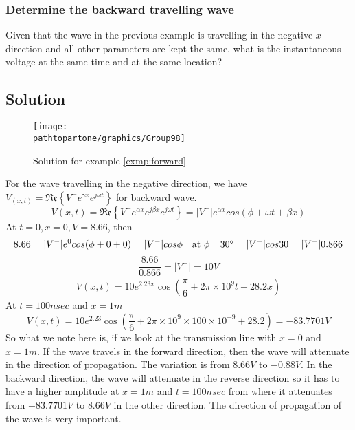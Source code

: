 \begin{exmp}
\subsubsection*{Determine the backward travelling wave}
Given that the wave in the previous example is travelling in the negative ${x}$ direction and all other parameters are kept the same, what is the instantaneous voltage at the same time and at the same location?

\subsection*{Solution}
\begin{figure}[h]
\centering
\texttt{[image: \\pathtopartone/graphics/Group98]}
\caption{Solution for example \ref{exmp:forward}}
\label{fig:group98}
\end{figure}

For the wave travelling in the negative direction, we have $V_{(x,t)} = \mathfrak{Re}\left\lbrace V^{-}e^{\gamma x}e^{j\omega t}\right\rbrace$ for backward wave.
\begin{dmath*}
V(x,t) = \mathfrak{Re}\left\lbrace{V^{-}e^{\alpha x}e^{j\beta x}e^{j\omega t}}\right\rbrace = |V^{-}|e^{\alpha x}cos{(\phi+\omega t + \beta x)}
\end{dmath*}
At ${t=0, x=0, V=8.66}$, then
\begin{dmath*}
{8.66} = {|V^{-}|}e^{0} cos({\phi + 0 + 0})
= {|V^-|{cos\phi}} \quad \text{at }\phi\text{= 30\textdegree} 
= {|V^-|{cos30}}
= {|V^-|{0.866}}
\end{dmath*}
\begin{dmath*}
\frac{8.66}{0.866} = {|V^-|} = 10V
\end{dmath*}
\begin{align*}
V({x,t}) = 10e^{2.23x} \cos({\dfrac{\pi}{6} + 2\pi\times10^9t + 28.2x})
\end{align*}
At ${t=100nsec}$ and ${x=1m}$
\begin{dmath*}
V({x,t}) = 10e^{2.23} \cos({\dfrac{\pi}{6} + 2\pi\times10^9\times100\times10^{-9} + 28.2})
= -83.7701V
\end{dmath*}
So what we note here is, if we look at the transmission line with ${x=0}$ and ${x=1m}$. If the wave travels in the forward direction, then the wave will attenuate in the direction of propagation. The variation is from ${8.66V}$ to ${-0.88V}$. In the backward direction, the wave will attenuate in the reverse direction so it has to have a higher amplitude at ${x=1m}$ and ${t=100nsec}$ from where it attenuates from ${-83.7701V}$ to ${8.66V}$ in the other direction. The direction of propagation of the wave is very important.
\end{exmp}

